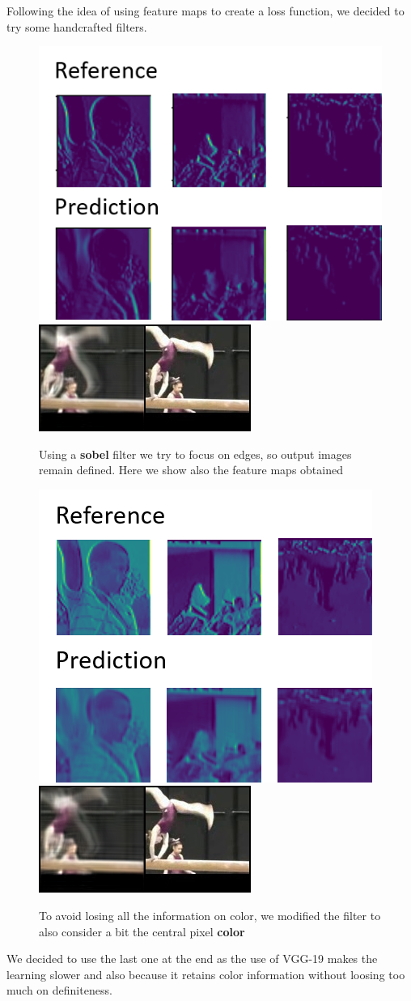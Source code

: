 \documentclass[11pt, a4paper]{article}
\begin{document}
	Following the idea of using feature maps to create a loss function, we decided to try some handcrafted filters.
	\begin{figure}
		\includegraphics[width=.5\textwidth]{map_sobel}
		\includegraphics[width=.3\textheight]{sobel}
		\caption{Using a \textbf{sobel} filter we try to focus on edges, so output images remain defined. Here we show also the feature maps obtained}
		\label{feature-map}
	\end{figure}
	\begin{figure}
		\includegraphics[width=0.3\textheight]{sobel_color_map}
		\includegraphics[width=0.3\textheight]{sobel_color}
		\caption{To avoid losing all the information on color, we modified the filter to also consider a bit the central pixel \textbf{color}}
		\label{color-feature-map}
	\end{figure}
	We decided to use the last one at the end as the use of VGG-19 makes the learning slower and also because it retains color information without loosing too much on definiteness.
\end{document}
